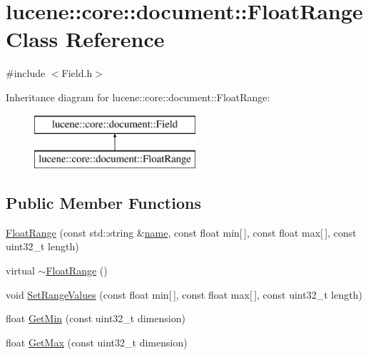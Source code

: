 \hypertarget{classlucene_1_1core_1_1document_1_1FloatRange}{}\section{lucene\+:\+:core\+:\+:document\+:\+:Float\+Range Class Reference}
\label{classlucene_1_1core_1_1document_1_1FloatRange}


{\ttfamily \#include $<$Field.\+h$>$}

Inheritance diagram for lucene\+:\+:core\+:\+:document\+:\+:Float\+Range\+:\begin{figure}[H]
\begin{center}
\leavevmode
\includegraphics[height=2.000000cm]{classlucene_1_1core_1_1document_1_1FloatRange}
\end{center}
\end{figure}
\subsection*{Public Member Functions}
\begin{DoxyCompactItemize}
\item 
\mbox{\hyperlink{classlucene_1_1core_1_1document_1_1FloatRange_a69d45b11fa82af7396120419ece24be4}{Float\+Range}} (const std\+::string \&\mbox{\hyperlink{classlucene_1_1core_1_1document_1_1Field_a52f673f3b3abb14b180f5159f4726537}{name}}, const float min\mbox{[}$\,$\mbox{]}, const float max\mbox{[}$\,$\mbox{]}, const uint32\+\_\+t length)
\item 
virtual \mbox{\hyperlink{classlucene_1_1core_1_1document_1_1FloatRange_a21159cec07e157c991dd7da09fec5ad7}{$\sim$\+Float\+Range}} ()
\item 
void \mbox{\hyperlink{classlucene_1_1core_1_1document_1_1FloatRange_af9827075d0e5277455e9cadd16e79f6d}{Set\+Range\+Values}} (const float min\mbox{[}$\,$\mbox{]}, const float max\mbox{[}$\,$\mbox{]}, const uint32\+\_\+t length)
\item 
float \mbox{\hyperlink{classlucene_1_1core_1_1document_1_1FloatRange_ab39e75504d05629914310e93f8c468d4}{Get\+Min}} (const uint32\+\_\+t dimension)
\item 
float \mbox{\hyperlink{classlucene_1_1core_1_1document_1_1FloatRange_a99ad9287e0363b51af717ca02664a6c6}{Get\+Max}} (const uint32\+\_\+t dimension)
\end{DoxyCompactItemize}
